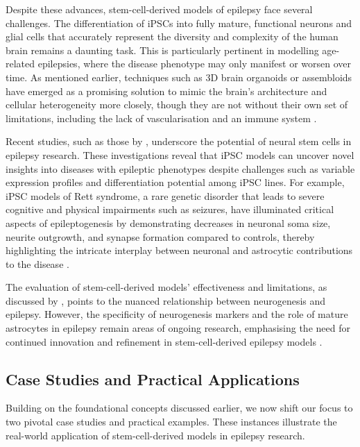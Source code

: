\documentclass[10pt]{article}
\begin{document}
\begin{sloppypar}
  Despite these advances, stem-cell-derived models of epilepsy face several challenges. The differentiation of iPSCs into fully mature, functional neurons and glial cells that accurately represent the diversity and complexity of the human brain remains a daunting task. This is particularly pertinent in modelling age-related epilepsies, where the disease phenotype may only manifest or worsen over time. As mentioned earlier, techniques such as 3D brain organoids or assembloids have emerged as a promising solution to mimic the brain’s architecture and cellular heterogeneity more closely, though they are not without their own set of limitations, including the lack of vascularisation and an immune system \citep{lancaster_cerebral_2013, di_lullo_use_2017}.

  Recent studies, such as those by \citeauthor{thodeson_neural_2017} \citeyearpar{thodeson_neural_2017}, underscore the potential of neural stem cells in epilepsy research. These investigations reveal that iPSC models can uncover novel insights into diseases with epileptic phenotypes despite challenges such as variable expression profiles and differentiation potential among iPSC lines. For example, iPSC models of Rett syndrome, a rare genetic disorder that leads to severe cognitive and physical impairments such as seizures, have illuminated critical aspects of epileptogenesis by demonstrating decreases in neuronal soma size, neurite outgrowth, and synapse formation compared to controls, thereby highlighting the intricate interplay between neuronal and astrocytic contributions to the disease \citep{marchetto_model_2010}.

  The evaluation of stem-cell-derived models’ effectiveness and limitations, as discussed by \citeauthor{kandemir_investigation_2022} \citeyearpar{kandemir_investigation_2022}, points to the nuanced relationship between neurogenesis and epilepsy. However, the specificity of neurogenesis markers and the role of mature astrocytes in epilepsy remain areas of ongoing research, emphasising the need for continued innovation and refinement in stem-cell-derived epilepsy models \citep{jessberger_epilepsy_2015}.

  \subsection{Case Studies and Practical Applications}
  \label{sec:case-studies-and-practical-applications}

  Building on the foundational concepts discussed earlier, we now shift our focus to two pivotal case studies and practical examples. These instances illustrate the real-world application of stem-cell-derived models in epilepsy research.


\end{sloppypar}
\end{document}
